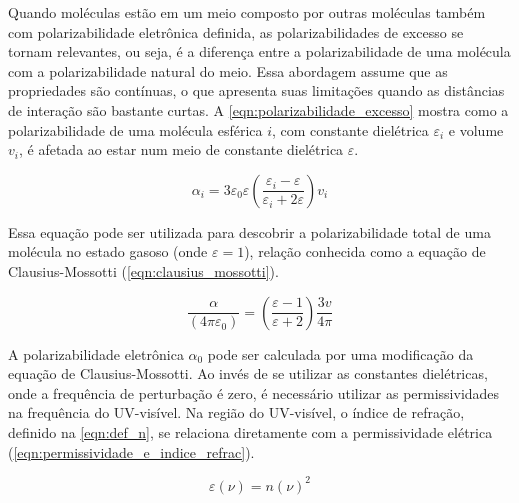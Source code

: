 	Quando moléculas estão em um meio composto por outras moléculas também com polarizabilidade eletrônica definida,  as polarizabilidades de excesso se tornam relevantes, ou seja, é a diferença entre a polarizabilidade de uma molécula com a polarizabilidade natural do meio. Essa abordagem assume que as propriedades são contínuas, o que apresenta suas limitações quando as distâncias de interação são bastante curtas. A \autoref{eqn:polarizabilidade_excesso} mostra como a polarizabilidade de uma molécula esférica \(i\), com constante dielétrica \(\varepsilon_i\) e volume \(v_i\), é afetada ao estar num meio de constante dielétrica \(\varepsilon\). 
	
	\begin{equation}
		\alpha_i = 3 \varepsilon_{ 0 } \varepsilon \left( \dfrac{\varepsilon_i - \varepsilon}{\varepsilon_i + 2 \varepsilon}  \right) v_i
		\label{eqn:polarizabilidade_excesso}
	\end{equation}
	 
	 Essa equação pode ser utilizada para descobrir a polarizabilidade total de uma molécula no estado gasoso (onde \(\varepsilon = 1\)), relação conhecida como a equação de Clausius-Mossotti (\autoref{eqn:clausius_mossotti})\cite{Rysselberghe1931, Atkins2017}.
	  
	 
	 \begin{equation}
		\dfrac { \alpha } { \left( 4 \pi \varepsilon _ { 0 } \right) } = \left( \dfrac { \varepsilon - 1 } { \varepsilon + 2 } \right) \dfrac { 3 v } { 4 \pi }
		\label{eqn:clausius_mossotti}
	 \end{equation}
	
	A polarizabilidade eletrônica \(\alpha_0\) pode ser calculada por uma modificação da equação de Clausius-Mossotti. Ao invés de se utilizar as constantes dielétricas, onde a frequência de perturbação é zero, é necessário utilizar as permissividades na frequência do UV-visível. Na região do UV-visível, o índice de refração, definido na \autoref{eqn:def_n}, se relaciona diretamente com a permissividade elétrica (\autoref{eqn:permissividade_e_indice_refrac}).\cite{Atkins2017}
	
	\begin{equation}
		\varepsilon(\nu) = n(\nu)^2
		\label{eqn:permissividade_e_indice_refrac}
	\end{equation} 
	
